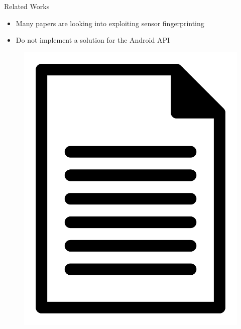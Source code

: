 \documentclass[aspectratio=169]{beamer}
[aspectratio=169] %
\begin{document}
\begin{frame}{Related Works}
  \begin{minipage}{0.49\textwidth} 
    \begin{itemize}
      \item Many papers are looking into exploiting sensor fingerprinting
      \pause
      \item Do not implement a solution for the Android API
    \end{itemize}
  \end{minipage}
  \hfill
  \begin{minipage}{0.49\textwidth} 
    \begin{figure}
      \centering
      \includegraphics[height=0.5\textheight]{figures/paper.png}
    \end{figure}
  \end{minipage}
\end{frame}
\end{document}
